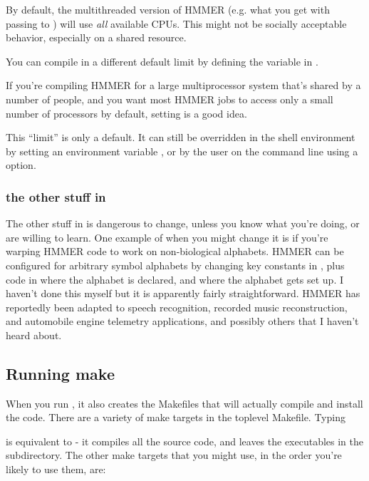 By default, the multithreaded version of HMMER (e.g. what you get with
passing  to ) will use
\emph{all} available CPUs. This might not be socially acceptable
behavior, especially on a shared resource. 

You can compile in a different default limit by defining the
 variable in .

If you're compiling HMMER for a large multiprocessor system that's
shared by a number of people, and you want most HMMER jobs to access
only a small number of processors by default, setting
 is a good idea.

This ``limit'' is only a default. It can still be overridden in the
shell environment by setting an environment variable
, or by the user on the command line using a
 option.

\subsubsection{the other stuff in }
\label{section:alphabet-config}

The other stuff in  is dangerous to change, unless you
know what you're doing, or are willing to learn. One example of when
you might change it is if you're warping HMMER code to work on
non-biological alphabets. HMMER can be configured for arbitrary symbol
alphabets by changing key constants in , plus code in
 where the alphabet is declared, and 
where the alphabet gets set up. I haven't done this myself but it is
apparently fairly straightforward. HMMER has reportedly been adapted
to speech recognition, recorded music reconstruction, and automobile
engine telemetry applications, and possibly others that I haven't
heard about.

\subsection{Running make}

When you run , it also creates the Makefiles that will
actually compile and install the code.  There are a variety of make
targets in the toplevel Makefile. Typing


is equivalent to  - it compiles all the source code,
and leaves the executables in the  subdirectory.  The other
make targets that you might use, in the order you're likely to use
them, are:

